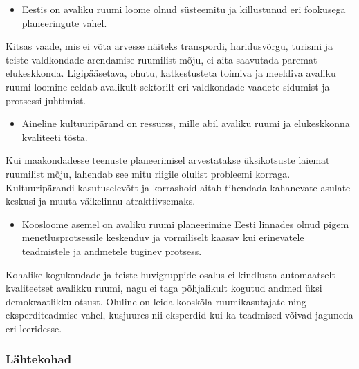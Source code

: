 \documentclass[estonian,]{article}
\providecommand{\tightlist}{%
  \setlength{\itemsep}{0pt}\setlength{\parskip}{0pt}}
\begin{document}
\begin{points}
\begin{itemize}
\tightlist
\item
  Eestis on avaliku ruumi loome olnud süsteemitu ja killustunud eri
  fookusega planeeringute vahel.
\end{itemize}

Kitsas vaade, mis ei võta arvesse näiteks transpordi, haridusvõrgu,
turismi ja teiste valdkondade arendamise ruumilist mõju, ei aita
saavutada paremat elukeskkonda. Ligipääsetava, ohutu, katkestusteta
toimiva ja meeldiva avaliku ruumi loomine eeldab avalikult sektorilt eri
valdkondade vaadete sidumist ja protsessi juhtimist.

\begin{itemize}
\tightlist
\item
  Aineline kultuuripärand on ressurss, mille abil avaliku ruumi ja
  elukeskkonna kvaliteeti tõsta.
\end{itemize}

Kui maakondadesse teenuste planeerimisel arvestatakse üksikotsuste
laiemat ruumilist mõju, lahendab see mitu riigile olulist probleemi
korraga. Kultuuripärandi kasutuselevõtt ja korrashoid aitab tihendada
kahanevate asulate keskusi ja muuta väikelinnu atraktiivsemaks.

\begin{itemize}
\tightlist
\item
  Koosloome asemel on avaliku ruumi planeerimine Eesti linnades olnud
  pigem menetlusprotsessile keskenduv ja vormiliselt kaasav kui
  erinevatele teadmistele ja andmetele tuginev protsess.
\end{itemize}

Kohalike kogukondade ja teiste huvigruppide osalus ei kindlusta
automaatselt kvaliteetset avalikku ruumi, nagu ei taga põhjalikult
kogutud andmed üksi demokraatlikku otsust. Oluline on leida kooskõla
ruumikasutajate ning eksperditeadmise vahel, kusjuures nii eksperdid kui
ka teadmised võivad jaguneda eri leeridesse.
\end{points}

\hypertarget{luxe4htekohad-1}{%
\subsubsection*{Lähtekohad}\label{luxe4htekohad-1}}
\end{document}
